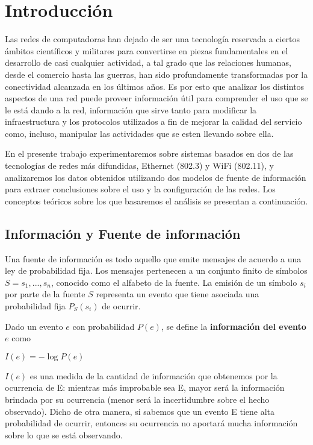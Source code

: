 \section{Introducción}

Las redes de computadoras han dejado de ser 
una tecnología reservada a ciertos ámbitos científicos y militares para convertirse
en piezas fundamentales en el desarrollo de casi cualquier actividad, a tal grado que las relaciones humanas, 
desde el comercio hasta las guerras, han sido profundamente transformadas por la conectividad
alcanzada en los últimos años.  
Es por esto que analizar los distintos aspectos de una red
puede proveer información útil para comprender el uso que se le está dando a la red, información que sirve tanto para
modificar la infraestructura y los protocolos
utilizados a fin de mejorar la calidad del servicio como, incluso, manipular las actividades que se esten llevando sobre ella.


En el presente trabajo experimentaremos sobre sistemas basados en dos de las tecnologías de redes más difundidas, Ethernet (802.3) y WiFi (802.11), y analizaremos los datos obtenidos utilizando dos modelos de fuente de información para extraer conclusiones sobre el uso y la configuración de las redes. Los conceptos teóricos sobre los que basaremos el análisis se presentan a continuación.


\subsection{Información y Fuente de información}

Una fuente de información es todo aquello que emite mensajes de acuerdo a una ley de probabilidad fija. Los mensajes pertenecen a un conjunto finito de símbolos $S={s_{1},...,s_{n}}$, conocido como el alfabeto de la fuente. La emisión de un símbolo $s_i$ por parte de la fuente $S$ representa un evento que tiene asociada una probabilidad fija $P_S(s_i)$ de ocurrir. 

Dado un evento $e$ con probabilidad $P(e)$, se define la \textbf{información del evento $e$} como

\begin{center}
$I(e)=-\log{P(e)}$ 
\end{center}

$I(e)$ es una medida de la cantidad de información que obtenemos por la ocurrencia de E: mientras más improbable sea E, mayor será la información brindada por su ocurrencia (menor será la incertidumbre sobre el hecho observado). Dicho de otra manera, si sabemos que un evento E tiene alta probabilidad de ocurrir, entonces su ocurrencia no aportará mucha información sobre lo que se está observando.



